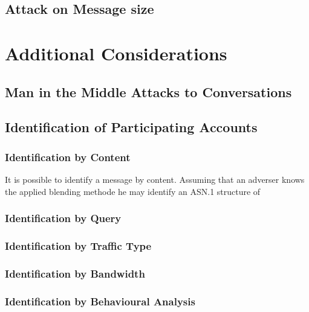 \section{Attack on Message size}


\chapter{Additional Considerations}
\section{Man in the Middle Attacks to Conversations}


\section{Identification of Participating Accounts}


\subsection{Identification by Content}
It is possible to identify a message by content. Assuming that an adverser knows the applied blending methode he may identify an ASN.1 structure of 


\subsection{Identification by Query}


\subsection{Identification by Traffic Type}


\subsection{Identification by Bandwidth}


\subsection{Identification by Behavioural Analysis}

